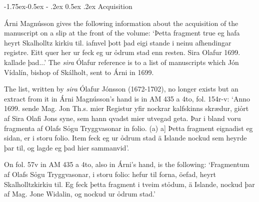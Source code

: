 \documentclass[11pt,twoside]{article}\makeatletter
\makeatletter
\def\ref{}
\renewcommand\subsection{\@startsection{subsection}{2}{\z@}%
     {-1.75ex\@plus -0.5ex \@minus- .2ex}%
     {0.5ex \@plus .2ex}%
     {\reset@font\Large\sffamily}}
\makeatother
\begin{document}
\subsection{Acquisition}
\par
 {\name Árni Magnússon} gives the following information about the acquisition of the manuscript on a slip at the front of the volume: ‘Þetta fragment true eg hafa {\hskip1pt}\newline  heyrt Skalholltz kirkiu til. {\hskip1pt}\newline  iafnvel þott þad eigi stande {\hskip1pt}\newline  i neinu afhendingar registre. {\hskip1pt}\newline  Eitt quer her ur feck eg ur ỏd{\hskip1pt}\newline rum stad enn resten. {\hskip1pt}\newline  Sira Olafur 1699. kallade þad...’ The \textit{sira} Ólafur reference is to a list of manuscripts which  {\name Jón Vídalín}, bishop of  {\name Skálholt}, sent to Árni in 1699. \par
The list, written by \textit{sira}  {\name Ólafur Jónsson} (1672-1702), no longer exists but an extract from it in Árni Magnússon's hand is in  {\ref AM 435 a 4to}, fol. 154r-v: ‘Anno 1699. sende Mag. Jon Th.s. {\hskip1pt}\newline  mier Registur yfir nockrar kalf{\hskip1pt}\newline skinns skrædur, giỏrt af Sira Olafi Jons {\hskip1pt}\newline  syne, sem hann qvadst mier ut{\hskip1pt}\newline vegad geta. Þar i bland voru {\hskip1pt}\newline  fragmenta af Olafs Sỏgu Tryggva{\hskip1pt}\newline sonar in folio. (a)  a] Þetta fragment eignadist eg sidan, er i {\hskip1pt}\newline  storu folio. Item feck eg ur ỏdrum {\hskip1pt}\newline  stad ä Islande nockud sem heyrde þar {\hskip1pt}\newline  til, og lagde eg þad hier sammanvid’. \par
On fol. 57v in AM 435 a 4to, also in Árni's hand, is the following: ‘Fragmentum af Olafs Sỏgu Tryggvasonar, i storu folio: hefur til forna, öefad, heyrt Skalholltzkirkiu til. Eg feck þetta fragment i tveim stỏdum, ä Islande, nockud þar af Mag. Jone Widalin, og nockud ur ỏdrum stad.’ \par
\end{document}
